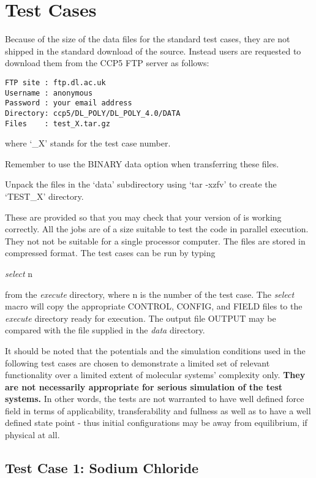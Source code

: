 \section{Test Cases}

Because of the size of the data files for the \D
standard test cases, they are not shipped in the standard
download of the \D source.  Instead users are requested
to download them from the CCP5 FTP server as follows:

\begin{lstlisting}
FTP site : ftp.dl.ac.uk
Username : anonymous
Password : your email address
Directory: ccp5/DL_POLY/DL_POLY_4.0/DATA
Files    : test_X.tar.gz
\end{lstlisting}

where `\_X' stands for the test case number.

Remember to use the BINARY data option when transferring these
files.

Unpack the files in the `data' subdirectory using `tar -xzfv'
to create the `TEST\_X' directory.

These are provided so that you may check that your version of
\D is working correctly.  All the jobs are of a size suitable
to test the code in parallel execution.  They not not be
suitable for a single processor computer.  The files are stored
in compressed format.  The test cases can be run by typing

{\sl select } n

\noindent from the {\em execute} directory, where n is the number of
the test case.  The {\sl select} macro will copy the appropriate
CONTROL, CONFIG, and FIELD files to the {\em execute} directory
ready for execution.  The output file OUTPUT may be compared with
the file supplied in the {\em data} directory.

It should be noted that the potentials and the simulation
conditions used in the following test cases are chosen to
demonstrate a limited set of relevant functionality over
a limited extent of molecular systems' complexity only.
{\bf They are not necessarily appropriate for serious
simulation of the test systems.}  In other words, the
tests are not warranted to have well defined force field
in terms of applicability, transferability and fullness
as well as to have a well defined state point - thus
initial configurations may be away from equilibrium, if
physical at all.

\subsection{Test Case 1: Sodium Chloride}

